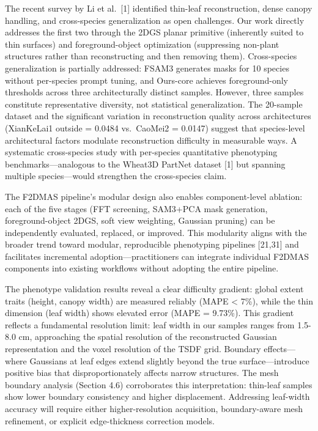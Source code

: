 \documentclass[11pt,a4paper]{article}
\begin{document}
The recent survey by Li et al.~{[}1{]} identified thin-leaf
reconstruction, dense canopy handling, and cross-species generalization
as open challenges. Our work directly addresses the first two through
the 2DGS planar primitive (inherently suited to thin surfaces) and
foreground-object optimization (suppressing non-plant structures rather
than reconstructing and then removing them). Cross-species
generalization is partially addressed: FSAM3 generates masks for 10
species without per-species prompt tuning, and Ours-core achieves
foreground-only thresholds across three architecturally distinct
samples. However, three samples constitute representative diversity, not
statistical generalization. The 20-sample dataset and the significant
variation in reconstruction quality across architectures (XianKeLai1
outside = 0.0484 vs.~CaoMei2 = 0.0147) suggest that species-level
architectural factors modulate reconstruction difficulty in measurable
ways. A systematic cross-species study with per-species quantitative
phenotyping benchmarks---analogous to the Wheat3D PartNet dataset
{[}1{]} but spanning multiple species---would strengthen the
cross-species claim.

The F2DMAS pipeline's modular design also enables component-level
ablation: each of the five stages (FFT screening, SAM3+PCA mask
generation, foreground-object 2DGS, soft view weighting, Gaussian
pruning) can be independently evaluated, replaced, or improved. This
modularity aligns with the broader trend toward modular, reproducible
phenotyping pipelines {[}21,31{]} and facilitates incremental
adoption---practitioners can integrate individual F2DMAS components into
existing workflows without adopting the entire pipeline.

The phenotype validation results reveal a clear difficulty gradient:
global extent traits (height, canopy width) are measured reliably (MAPE
\textless{} 7\%), while the thin dimension (leaf width) shows elevated
error (MAPE = 9.73\%). This gradient reflects a fundamental resolution
limit: leaf width in our samples ranges from 1.5-8.0 cm, approaching the
spatial resolution of the reconstructed Gaussian representation and the
voxel resolution of the TSDF grid. Boundary effects---where Gaussians at
leaf edges extend slightly beyond the true surface---introduce positive
bias that disproportionately affects narrow structures. The mesh
boundary analysis (Section 4.6) corroborates this interpretation:
thin-leaf samples show lower boundary consistency and higher
displacement. Addressing leaf-width accuracy will require either
higher-resolution acquisition, boundary-aware mesh refinement, or
explicit edge-thickness correction models.
\end{document}
